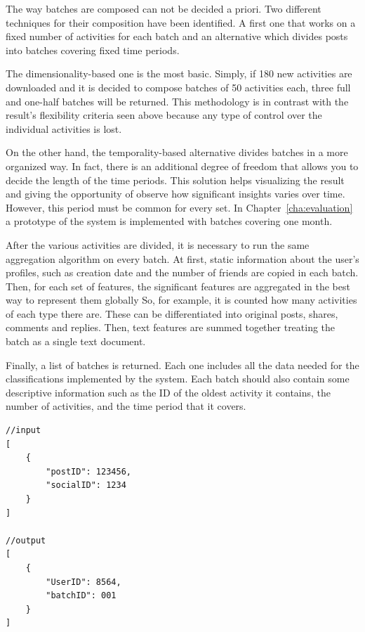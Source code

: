 The way batches are composed can not be decided a priori. Two different techniques for their composition have been identified.
A first one that works on a fixed number of activities for each batch and an alternative which divides posts into batches covering fixed time periods.

The dimensionality-based one is the most basic. Simply, if 180 new activities are downloaded and it is decided to compose batches of 50 activities each, three full and one-half batches will be returned.
This methodology is in contrast with the result's flexibility criteria seen above because any type of control over the individual activities is lost.

On the other hand, the temporality-based alternative divides batches in a more organized way.
In fact, there is an additional degree of freedom that allows you to decide the length of the time periods. 
This solution helps visualizing the result and giving the opportunity of observe how significant insights varies over time.
However, this period must be common for every set. In Chapter~\ref{cha:evaluation} a prototype of the system is implemented with batches covering one month.

After the various activities are divided, it is necessary to run the same aggregation algorithm on every batch.
At first, static information about the user's profiles, such as creation date and the number of friends are copied in each batch.
Then, for each set of features, the significant features are aggregated in the best way to represent them globally
So, for example, it is counted how many activities of each type there are. These can be differentiated into original posts, shares, comments and replies.
Then, text features are summed together treating the batch as a single text document.

Finally, a list of batches is returned. Each one includes all the data needed for the classifications implemented by the system.
Each batch should also contain some descriptive information such as the ID of the oldest activity it contains, the number of activities, and the time period that it covers.

\begin{multicols}{2}
\begin{verbatim}
//input
[
    {
        "postID": 123456,
        "socialID": 1234
    }
]
        
//output
[
    {
        "UserID": 8564,
        "batchID": 001
    }
]
\end{verbatim}
\end{multicols}


